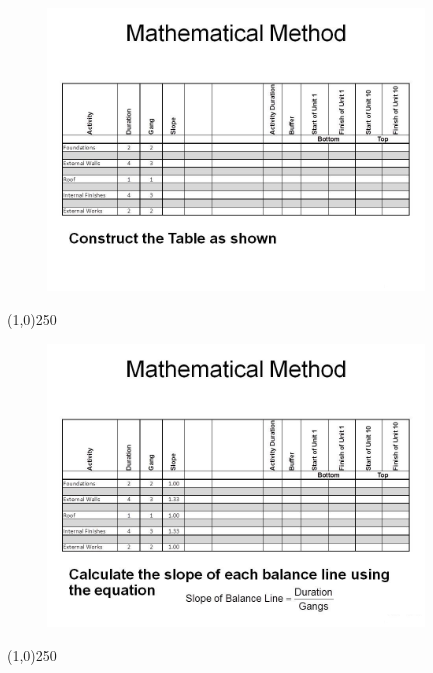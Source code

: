 \begin{frame}
\begin{figure}
	\centering
		\includegraphics[width = 10.0cm]{oldnotes/Slide271.jpg}
\end{figure}
\end{frame}
\begin{center}\line(1,0){250}\end{center}






\begin{frame}
\begin{figure}
	\centering
		\includegraphics[width = 10.0cm]{oldnotes/Slide272.jpg}
\end{figure}
\end{frame}
\begin{center}\line(1,0){250}\end{center}






